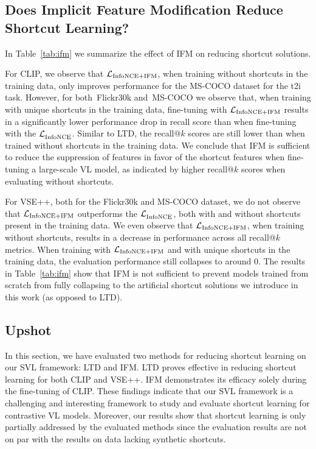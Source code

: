 \subsection{Does Implicit Feature Modification Reduce Shortcut Learning?}



In Table~\ref{tab:ifm} we summarize the effect of \ac{IFM} on reducing shortcut solutions. 

For CLIP, we observe that $\mathcal{L}_{\text{InfoNCE+IFM}}{}$, when training without shortcuts in the training data, only improves performance for the \ac{MS-COCO} dataset for the \ac{t2i} task. 
However, for both~\ac{Flickr30k} and~\ac{MS-COCO} we observe that, when training with unique shortcuts in the training data, fine-tuning with $\mathcal{L}_{\text{InfoNCE+IFM}}{}$ results in a significantly lower performance drop in recall score than when fine-tuning with the $\mathcal{L}_{\text{InfoNCE}}^{}$.
Similar to LTD, the recall@$k$ scores are still lower than when trained without shortcuts in the training data.
We conclude that IFM is sufficient to reduce the suppression of features in favor of the shortcut features when fine-tuning a large-scale \ac{VL} model, as indicated by higher recall@$k$ scores when evaluating without shortcuts.

For VSE++, both for the \ac{Flickr30k} and \ac{MS-COCO} dataset, we do not observe that $\mathcal{L}_{\text{InfoNCE+IFM}}{}$ outperforms the $\mathcal{L}_{\text{InfoNCE}}^{}$, both with and without shortcuts present in the training data. 
We even observe that $\mathcal{L}_{\text{InfoNCE+IFM}}{}$, when training without shortcuts, results in a decrease in performance across all recall@$k$ metrics.
When training with $\mathcal{L}_{\text{InfoNCE+IFM}}{}$ and with unique shortcuts in the training data, the evaluation performance still collapses to around 0.
The results in Table~\ref{tab:ifm} show that IFM is not sufficient to prevent models trained from scratch from fully collapsing to the artificial shortcut solutions we introduce in this work (as opposed to LTD).

\subsection{Upshot}

In this section, we have evaluated two methods for reducing shortcut learning on our \ac{SVL} framework: \ac{LTD} and \ac{IFM}.
	\ac{LTD} proves effective in reducing shortcut learning for both CLIP and VSE++.
	\ac{IFM} demonstrates its efficacy solely during the fine-tuning of CLIP.
	These findings indicate that our \ac{SVL} framework is a challenging and interesting framework to study and evaluate shortcut learning for contrastive \ac{VL} models.
	Moreover, our results show that shortcut learning is only partially addressed by the evaluated methods since the evaluation results are not on par with the results on data lacking synthetic shortcuts.
